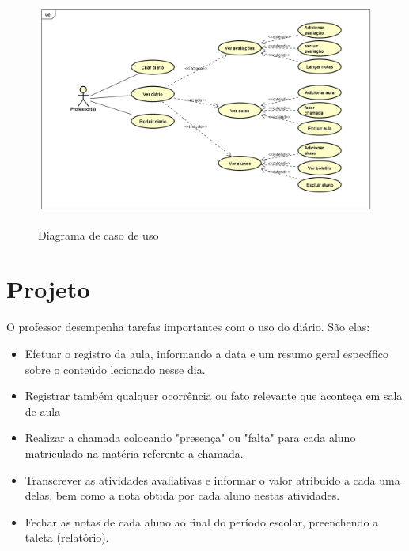 \begin{figure}[!htb]
	\centering
	\caption{Diagrama de caso de uso} %
	\includegraphics[scale=0.4]{UseCaseDiagram0}\\  %
	{\small } %
	\label{fig:UseCaseDiagram0} %
\end{figure}




\section{Projeto}


O professor desempenha tarefas importantes com o uso do diário. São elas:

\begin{itemize}
	\item Efetuar o registro da aula, informando a data e um resumo geral específico sobre o conteúdo lecionado nesse dia.
	
	\item Registrar também qualquer ocorrência ou fato relevante que aconteça em sala de aula
	
	\item Realizar a chamada colocando "presença" ou "falta" para cada aluno matriculado na matéria referente a chamada.
	
	\item Transcrever as atividades avaliativas e informar o valor atribuído a cada uma delas, bem como a nota obtida por cada aluno nestas atividades.
	
	\item Fechar as notas de cada aluno ao final do período escolar, preenchendo a taleta (relatório).
	
	
\end{itemize}

